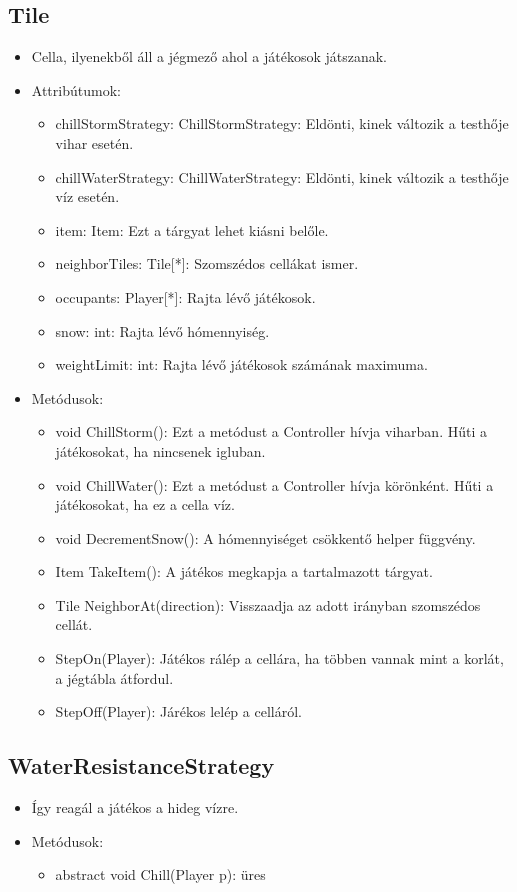 \subsection{Tile}
\begin{itemize}
	\item Cella, ilyenekből áll a jégmező ahol a játékosok játszanak.
	\item Attribútumok:
	\begin{itemize}
		\item chillStormStrategy: ChillStormStrategy: Eldönti, kinek változik a testhője vihar esetén.
		\item chillWaterStrategy: ChillWaterStrategy: Eldönti, kinek változik a testhője víz esetén.
		\item item: Item: Ezt a tárgyat lehet kiásni belőle.
		\item neighborTiles: Tile[*]: Szomszédos cellákat ismer.
		\item occupants: Player[*]: Rajta lévő játékosok.
		\item snow: int: Rajta lévő hómennyiség.
		\item weightLimit: int: Rajta lévő játékosok számának maximuma.		
	\end{itemize}
	\item Metódusok:
	\begin{itemize}
		\item void ChillStorm(): Ezt a metódust a Controller hívja viharban. Hűti a játékosokat, ha nincsenek igluban.
		\item void ChillWater(): Ezt a metódust a Controller hívja körönként. Hűti a játékosokat, ha ez a cella víz.
		\item void DecrementSnow(): A hómennyiséget csökkentő helper függvény.
		\item Item TakeItem(): A játékos megkapja a tartalmazott tárgyat.
		\item Tile NeighborAt(direction): Visszaadja az adott irányban szomszédos cellát.
		\item StepOn(Player): Játékos rálép a cellára, ha többen vannak mint a korlát, a jégtábla átfordul.
		\item StepOff(Player): Járékos lelép a celláról.
	\end{itemize}
\end{itemize}

\subsection{WaterResistanceStrategy}
\begin{itemize}
	\item Így reagál a játékos a hideg vízre.
	\item Metódusok:
	\begin{itemize}
		\item abstract void Chill(Player p): üres
	\end{itemize}
\end{itemize}

